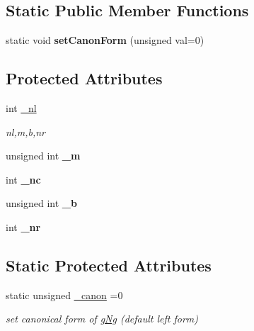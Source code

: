\subsection*{Static Public Member Functions}
\begin{DoxyCompactItemize}
\item 
\mbox{\label{classetvo_i_i_1_1g_ng_a6ceb1e64283a16aeec64dcc3a40ce4d9}} 
static void {\bfseries set\+Canon\+Form} (unsigned val=0)
\end{DoxyCompactItemize}
\subsection*{Protected Attributes}
\begin{DoxyCompactItemize}
\item 
\mbox{\label{classetvo_i_i_1_1g_ng_a9cb6c20901b91d34dd17157668ccd199}} 
int \mbox{\hyperlink{classetvo_i_i_1_1g_ng_a9cb6c20901b91d34dd17157668ccd199}{\+\_\+nl}}
\begin{DoxyCompactList}\small\item\em nl,m,b,nr \end{DoxyCompactList}\item 
\mbox{\label{classetvo_i_i_1_1g_ng_aa167ce6f4030dc5fae3e10750668d970}} 
unsigned int {\bfseries \+\_\+m}
\item 
\mbox{\label{classetvo_i_i_1_1g_ng_a4b856ea7fb171e3cdb619631dd78cfdd}} 
int {\bfseries \+\_\+nc}
\item 
\mbox{\label{classetvo_i_i_1_1g_ng_acfd602904616c0b6e5a51b35113fd9a3}} 
unsigned int {\bfseries \+\_\+b}
\item 
\mbox{\label{classetvo_i_i_1_1g_ng_ae0b4168e235fae57436f78e7c3362100}} 
int {\bfseries \+\_\+nr}
\end{DoxyCompactItemize}
\subsection*{Static Protected Attributes}
\begin{DoxyCompactItemize}
\item 
static unsigned \mbox{\hyperlink{classetvo_i_i_1_1g_ng_a788cd29adc53a556f5070d76cfbd80b2}{\+\_\+canon}} =0
\begin{DoxyCompactList}\small\item\em set canonical form of \mbox{\hyperlink{classetvo_i_i_1_1g_ng}{g\+Ng}} (default left form) \end{DoxyCompactList}\end{DoxyCompactItemize}


